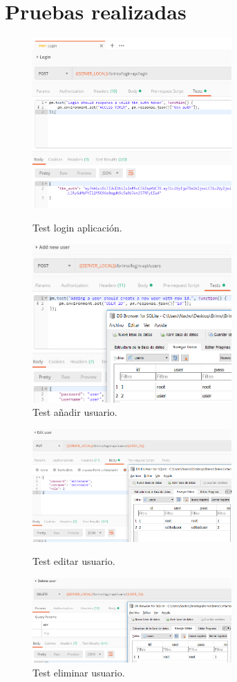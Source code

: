 \chapter{Pruebas realizadas}
\label{Anexo:pruebas}

\begin{figure}[!htb]
\includegraphics[width=3.00in]{images/tests/screenshots/1login.PNG}
\caption{Test login aplicación.}
\endminipage\hfill
{}
\includegraphics[width=3.00in]{images/tests/screenshots/2newuser.PNG}
\caption{Test añadir usuario.}
\endminipage\hfill
\end{figure}

\begin{figure}[!htb]
\includegraphics[width=3.00in]{images/tests/screenshots/3edituser.PNG}
\caption{Test editar usuario.}
\endminipage\hfill
{}
\includegraphics[width=3.00in]{images/tests/screenshots/4deleteuser.PNG}
\caption{Test eliminar usuario.}
\endminipage\hfill
\end{figure}

